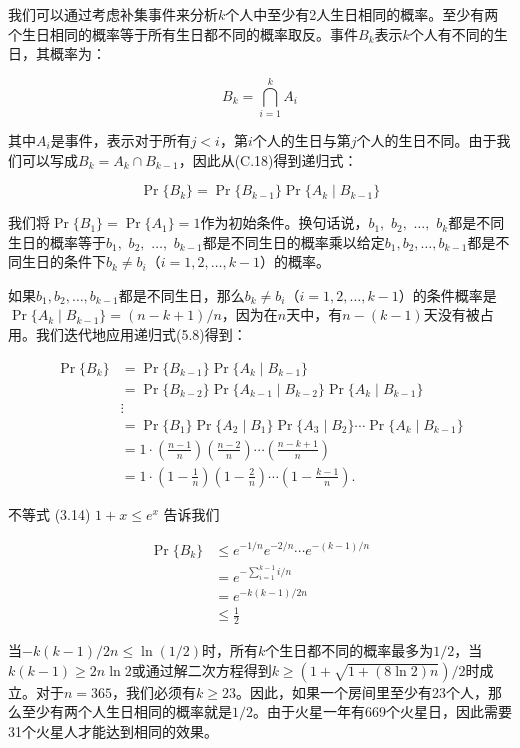 \documentclass[lang=cn,newtx,10pt,scheme=chinese]{elegantbook}
\begin{document}
我们可以通过考虑补集事件来分析$k$个人中至少有2人生日相同的概率。至少有两个生日相同的概率等于所有生日都不同的概率取反。事件$B_k$表示$k$个人有不同的生日，其概率为：

$$
B_k=\bigcap_{i=1}^k A_i
$$

其中$A_i$是事件，表示对于所有$j<i$，第$i$个人的生日与第$j$个人的生日不同。由于我们可以写成$B_k=A_k\cap B_{k-1}$，因此从(C.18)得到递归式：

$$
\operatorname{Pr}\{B_k\}=\operatorname{Pr}\{B_{k-1}\} \operatorname{Pr}\{A_k \mid B_{k-1}\}
$$

我们将$\operatorname{Pr}\{B_1\}=\operatorname{Pr}\{A_1\}=1$作为初始条件。换句话说，$b_1,$ $b_2,$ $\ldots,$ $b_k$都是不同生日的概率等于$b_1,$ $b_2,$ $\ldots,$ $b_{k-1}$都是不同生日的概率乘以给定$b_1, b_2, \ldots, b_{k-1}$都是不同生日的条件下$b_k \neq b_i$（$i=1,2,\ldots,k-1$）的概率。

如果$b_1, b_2, \ldots, b_{k-1}$都是不同生日，那么$b_k \neq b_i$（$i=1,2,\ldots,k-1$）的条件概率是$\operatorname{Pr}\{A_k \mid B_{k-1}\}=(n-k+1)/n$，因为在$n$天中，有$n-(k-1)$天没有被占用。我们迭代地应用递归式(5.8)得到：

$$
\begin{aligned}
\operatorname{Pr}\{B_k\} & =\operatorname{Pr}\{B_{k-1}\} \operatorname{Pr}\{A_k \mid B_{k-1}\} \\
& =\operatorname{Pr}\{B_{k-2}\} \operatorname{Pr}\{A_{k-1} \mid B_{k-2}\} \operatorname{Pr}\{A_k \mid B_{k-1}\} \\
& \vdots \\
& =\operatorname{Pr}\{B_1\} \operatorname{Pr}\{A_2 \mid B_1\} \operatorname{Pr}\{A_3 \mid B_2\} \cdots \operatorname{Pr}\{A_k \mid B_{k-1}\} \\
& =1 \cdot(\frac{n-1}{n})(\frac{n-2}{n}) \cdots(\frac{n-k+1}{n}) \\
& =1 \cdot(1-\frac{1}{n})(1-\frac{2}{n}) \cdots(1-\frac{k-1}{n}) .
\end{aligned}
$$

不等式 (3.14) $1+x \leq e^x$ 告诉我们

$$
\begin{aligned}
\operatorname{Pr}\{B_k\} & \leq e^{-1 / n} e^{-2 / n} \cdots e^{-(k-1) / n} \\
& =e^{-\sum_{i=1}^{k-1} i / n} \\
& =e^{-k(k-1) / 2 n} \\
& \leq \frac{1}{2}
\end{aligned}
$$

当$-k(k-1)/2n\leq \ln(1/2)$时，所有$k$个生日都不同的概率最多为$1/2$，当$k(k-1)\geq 2n\ln 2$或通过解二次方程得到$k\geq(1+\sqrt{1+(8\ln 2)n})/2$时成立。对于$n=365$，我们必须有$k\geq 23$。因此，如果一个房间里至少有23个人，那么至少有两个人生日相同的概率就是$1/2$。由于火星一年有669个火星日，因此需要31个火星人才能达到相同的效果。
\end{document}
